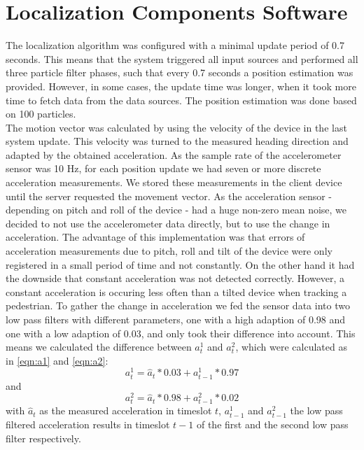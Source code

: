 \section{Localization Components Software}
The localization algorithm was configured with a minimal update period of 0.7 seconds. This means that the system triggered all input sources and performed all three particle filter phases, such that every 0.7 seconds a position estimation was provided. However, in some cases, the update time was longer, when it took more time to fetch data from the data sources. The position estimation was done based on 100 particles.\\
\noindent\hspace*{5mm}%
The motion vector was calculated by using the velocity of the device in the last system update. This velocity was turned to the measured heading direction and adapted by the obtained acceleration.  As the sample rate of the accelerometer sensor was 10 Hz, for each position update we had seven or more discrete acceleration measurements. We stored these measurements in the client device until the server requested the movement vector. As the acceleration sensor - depending on pitch and roll of the device - had a huge non-zero mean noise, we decided to not use the accelerometer data directly, but to use the change in acceleration. The advantage of this implementation was that errors of acceleration measurements due to pitch, roll and tilt of the device were only registered in a small period of time and not constantly. On the other hand it had the downside that constant acceleration was not detected correctly. However, a constant acceleration is occuring less often than a tilted device when tracking a pedestrian. To gather the change in acceleration we fed the sensor data into two low pass filters with different parameters, one with a high adaption of 0.98 and one with a low adaption of 0.03, and only took their difference into account. This means we calculated the difference between $a_{t}^1$ and $a_{t}^2$, which were calculated as in \ref{eqn:a1} and \ref{eqn:a2}:
\begin{equation}
a_{t}^{1} = \hat{a}_{t}*0.03 + a_{t-1}^{1} * 0.97
\label{eqn:a1}
\end{equation}
and
\begin{equation}
a_{t}^{2} = \hat{a}_{t}*0.98 + a_{t-1}^{2} * 0.02
\label{eqn:a2}
\end{equation}
with $\hat{a}_{t}$ as the measured acceleration in timeslot $t$, $a_{t-1}^{1}$ and $a_{t-1}^{2}$ the low pass filtered acceleration results in timeslot $t-1$ of the first and the second low pass filter respectively.\\
